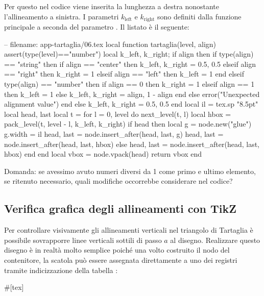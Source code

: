 Per questo nel codice viene inserita la lunghezza a destra nonostante
l'allineamento a sinistra. I parametri \( k_\mathrm{left} \) e \(
k_\mathrm{right} \) sono definiti dalla funzione principale  a
seconda del parametro . Il listato è il seguente:
\begin{lines}
-- filename: app-tartaglia/06.tex
local function tartaglia(level, align)
    assert(type(level)=="number")
    local k_left, k_right; if align then
        if type(align) == "string" then
            if align == "center" then
                k_left, k_right = 0.5, 0.5
            elseif align == "right" then
                k_right = 1
            elseif align == "left" then
                k_left = 1
            end
        elseif type(align) == "number" then
            if align == 0 then
                k_right = 1
            elseif align == 1 then
                k_left = 1
            else
                k_left, k_right = align, 1 - align
            end
        else
            error("Unexpected alignment value")
        end
    else
        k_left, k_right = 0.5, 0.5
    end
    local il = tex.sp "8.5pt"
    local head, last
    local t = {}
    for l = 0, level do
        next_level(t, l)
        local hbox = pack_level(t, level - l, k_left, k_right)
        if head then
            local g = node.new("glue")
            g.width = il
            head, last = node.insert_after(head, last, g)
            head, last = node.insert_after(head, last, hbox)
        else
            head, last = node.insert_after(head, last, hbox)
        end
    end
    local vbox = node.vpack(head)
    return vbox
end
\end{lines}

Domanda: se avessimo avuto numeri diversi da 1 come primo e ultimo elemento, se
ritenuto necessario, quali modifiche occorrebbe considerare nel codice?


\subsection{Verifica grafica degli allineamenti con TikZ}

Per controllare visivamente gli allineamenti verticali nel triangolo di
Tartaglia è possibile sovrapporre linee verticali sottili di passo \( a \) al
disegno. Realizzare questo disegno è in realtà molto semplice poiché una volto
costruito il nodo del contenitore, la scatola può essere assegnata direttamente
a uno dei registri tramite indicizzazione della tabella :
\begin{lines}
#[tex]
\newbox\tartbox %
\box\tartbox
\bye
\end{lines}

